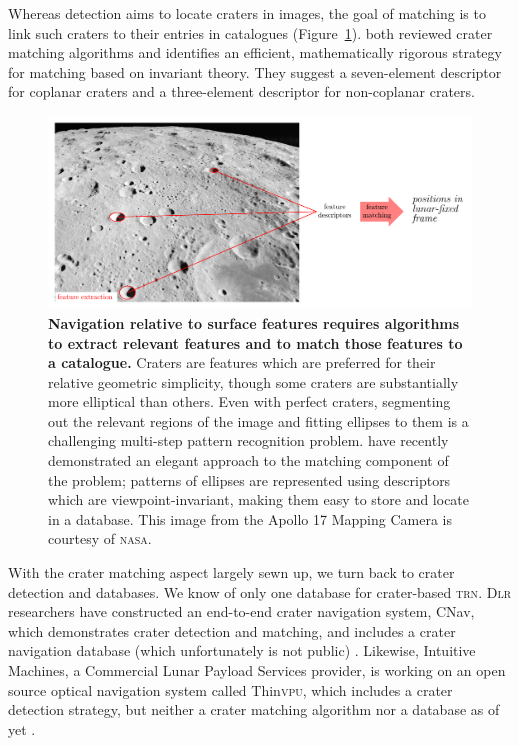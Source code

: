 \documentclass[12pt]{olfmemo}
\begin{document}
Whereas detection aims to locate craters in images, the goal of matching is to link such craters to their entries in catalogues (Figure~\ref{fig:cdma}). \citet{Christian2020} both reviewed crater matching algorithms and identifies an efficient, mathematically rigorous strategy for matching based on invariant theory. They suggest a seven-element descriptor for coplanar craters and a three-element descriptor for non-coplanar craters.

\begin{figure}
\includegraphics[width=\textwidth]{cdma.pdf}
\caption{\label{fig:cdma}\textbf{Navigation relative to surface features requires algorithms to extract relevant features and to match those features to a catalogue.} Craters are features which are preferred for their relative geometric simplicity, though some craters are substantially more elliptical than others. Even with perfect craters, segmenting out the relevant regions of the image and fitting ellipses to them is a challenging multi-step pattern recognition problem. \citet{Christian2020} have recently demonstrated an elegant approach to the matching component of the problem; patterns of ellipses are represented using descriptors which are viewpoint-invariant, making them easy to store and locate in a database. This image from the Apollo 17 Mapping Camera is courtesy of \textsc{nasa}. }
\end{figure}

With the crater matching aspect largely sewn up, we turn back to crater detection and databases. We know of only one database for crater-based \textsc{trn}. \textsc{Dlr} researchers have constructed an end-to-end crater navigation system, CNav, which demonstrates crater detection and matching, and includes a crater navigation database (which unfortunately is not public) \citep{Maass2016,Maass2020}. Likewise, Intuitive Machines, a Commercial Lunar Payload Services provider, is working on an open source optical navigation system called Thin\textsc{vpu}, which includes a crater detection strategy, but neither a crater matching algorithm nor a database as of yet \citep{Stewart2020}.
\end{document}
